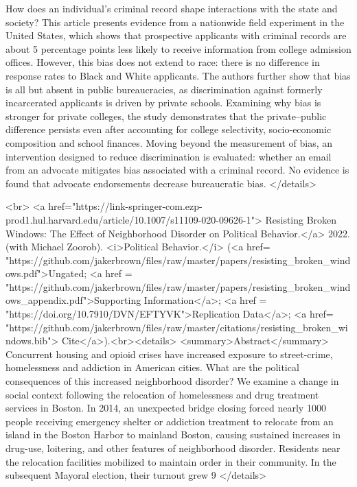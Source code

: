         How does an individual's criminal record shape interactions with the state and society? This article presents evidence from a nationwide field experiment in the United States, which shows that prospective applicants with criminal records are about 5 percentage points less likely to receive information from college admission offices. However, this bias does not extend to race: there is no difference in response rates to Black and White applicants. The authors further show that bias is all but absent in public bureaucracies, as discrimination against formerly incarcerated applicants is driven by private schools. Examining why bias is stronger for private colleges, the study demonstrates that the private–public difference persists even after accounting for college selectivity, socio-economic composition and school finances. Moving beyond the measurement of bias, an intervention designed to reduce discrimination is evaluated: whether an email from an advocate mitigates bias associated with a criminal record. No evidence is found that advocate endorsements decrease bureaucratic bias.
          </details>

    <br>
    <a href="https://link-springer-com.ezp-prod1.hul.harvard.edu/article/10.1007/s11109-020-09626-1"> Resisting Broken Windows: The Effect of Neighborhood Disorder on Political Behavior.</a> 2022. (with Michael Zoorob). <i>Political Behavior.</i> (<a href= "https://github.com/jakerbrown/files/raw/master/papers/resisting_broken_windows.pdf">Ungated; <a href = "https://github.com/jakerbrown/files/raw/master/papers/resisting_broken_windows_appendix.pdf">Supporting Information</a>; <a href = "https://doi.org/10.7910/DVN/EFTYVK">Replication Data</a>; <a href= "https://github.com/jakerbrown/files/raw/master/citations/resisting_broken_windows.bib"> Cite</a>).<br><details>
            <summary>Abstract</summary>
    Concurrent housing and opioid crises have increased exposure to street-crime, homelessness and addiction in American cities. What are the political consequences of this increased neighborhood disorder? We examine a change in social context following the relocation of homelessness and drug treatment services in Boston. In 2014, an unexpected bridge closing forced nearly 1000 people receiving emergency shelter or addiction treatment to relocate from an island in the Boston Harbor to mainland Boston, causing sustained increases in drug-use, loitering, and other features of neighborhood disorder. Residents near the relocation facilities mobilized to maintain order in their community. In the subsequent Mayoral election, their turnout grew 9%
          </details>

